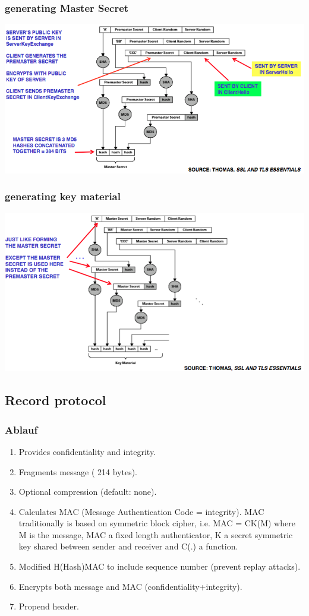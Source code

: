 \documentclass[10pt]{article}
\begin{document}
\subsubsection{generating Master Secret}
\begin{center}
	\includegraphics[scale=0.5]{ssl_master.png}
\end{center}
\subsubsection{generating key material}
\begin{center}
	\includegraphics[scale=0.5]{ssl_key_materials.png}
\end{center}
\subsection{Record protocol}
\subsubsection{Ablauf}
\begin{enumerate}
	\item Provides confidentiality and integrity.
	\item Fragments message ( 214 bytes).
	\item Optional compression (default: none).
	\item Calculates MAC (Message Authentication Code = integrity). MAC traditionally is based on symmetric block cipher, i.e. MAC = CK(M) where M is the message, MAC a fixed length authenticator, K a secret symmetric key shared between sender and receiver and C(.) a function.
	\item Modified H(Hash)MAC to include sequence number (prevent replay attacks).
	\item Encrypts both message and MAC (confidentiality+integrity).
	\item Propend header.
\end{enumerate}
\end{document}
